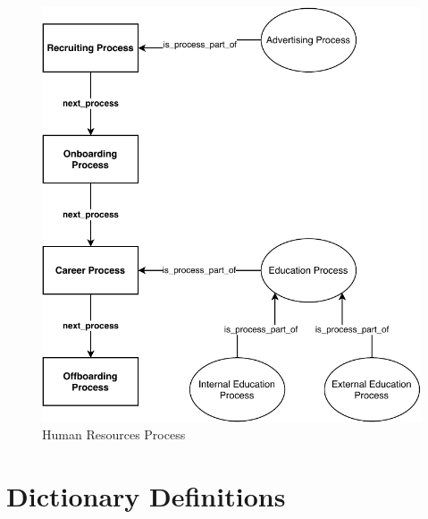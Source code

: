 \documentclass[a4paper, DIV=13, BCOR=0cm]{scrbook}
\begin{document}
\begin{figure}[h]
	\caption{Human Resources Process}
	\centering
	\includegraphics[width=1\textwidth]{Diagrams/hr-process.pdf}
\end{figure}

\clearpage
\printnoidxglossaries

\printbibliography

\newpage

\section{Dictionary Definitions}
\label{dictionary}
\end{document}
